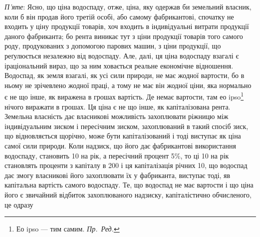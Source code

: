 \emph{П’яте}: Ясно, що ціна водоспаду, отже, ціна, яку одержав би земельний
власник, коли б він продав його третій особі, або самому фабрикантові,
спочатку не входить у ціну продукції товарів, хоч входить в індивідуальні
витрати продукції даного фабриканта; бо рента виникає тут з ціни продукції
товарів того самого роду, продукованих з допомогою парових машин,
з ціни продукції, що реґулюється незалежно від водоспаду. Але, далі, ця ціна
водоспаду взагалі є іраціональний вираз, що за ним ховається реальне економічне
відношення. Водоспад, як земля взагалі, як усі сили природи, не має
жодної вартости, бо в ньому не зрічевлено жодної праці, а тому не має він
жодної ціни, яка нормально є не що інше, як виражена в грошах вартість.
Де немає вартости, там ео ipso\footnote*{
Ео ipso — тим самим. \emph{Пр.~Ред.}
} нічого виражати в грошах. Ця ціна є не
що інше, як капіталізована рента. Земельна власність дає власникові можливість
захоплювати ріжницю між індивідуальним зиском і пересічним зиском,
захоплюваний в такий спосіб зиск, що відновляється щорічно, може бути капіталізований
і тоді виступає як ціна самої сили природи. Коли надзиск, що
його дає фабрикантові використання водоспаду, становить 10 на рік, а
пересічний процент 5\%, то ці 10 на рік становлять проценти з капіталу в
200 і ця капіталізація річних 10, що водоспад дає змогу власникові
його захоплювати їх у фабриканта, виступає тоді, яв капітальна вартість самого
водоспаду. Те, що водоспад не має вартости і що ціна його є звичайний
відбиток захоплюваного надзиску, капіталістично обчисленого, це одразу
\parbreak{}  %
